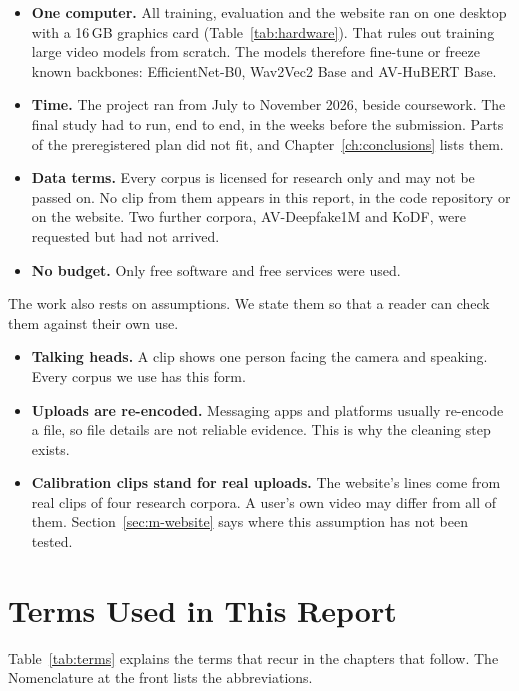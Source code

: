 \begin{itemize}
    \item \textbf{One computer.} All training, evaluation and the website ran
    on one desktop with a 16\,GB graphics card (Table~\ref{tab:hardware}).
    That rules out training large video models from scratch. The models
    therefore fine-tune or freeze known backbones: EfficientNet-B0, Wav2Vec2
    Base and AV-HuBERT Base.
    \item \textbf{Time.} The project ran from July to November 2026, beside
    coursework. The final study had to run, end to end, in the weeks before
    the submission. Parts of the preregistered plan did not fit, and
    Chapter~\ref{ch:conclusions} lists them.
    \item \textbf{Data terms.} Every corpus is licensed for research only and
    may not be passed on. No clip from them appears in this report, in the
    code repository or on the website. Two further corpora, AV-Deepfake1M and
    KoDF, were requested but had not arrived.
    \item \textbf{No budget.} Only free software and free services were used.
\end{itemize}

The work also rests on assumptions. We state them so that a reader can check
them against their own use.

\begin{itemize}
    \item \textbf{Talking heads.} A clip shows one person facing the camera and
    speaking. Every corpus we use has this form.
    \item \textbf{Uploads are re-encoded.} Messaging apps and platforms usually
    re-encode a file, so file details are not reliable evidence. This is why
    the cleaning step exists.
    \item \textbf{Calibration clips stand for real uploads.} The website's
    lines come from real clips of four research corpora. A user's own video
    may differ from all of them. Section~\ref{sec:m-website} says where this
    assumption has not been tested.
\end{itemize}

\section{Terms Used in This Report}

Table~\ref{tab:terms} explains the terms that recur in the chapters that
follow. The Nomenclature at the front lists the abbreviations.

